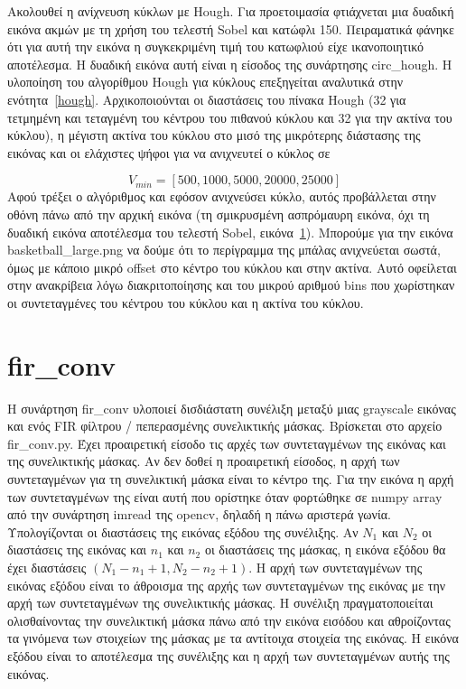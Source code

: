 \documentclass{article}
\begin{document}
Ακολουθεί η ανίχνευση κύκλων με Hough. Για προετοιμασία φτιάχνεται μια δυαδική
εικόνα ακμών με τη χρήση του τελεστή Sobel και κατώφλι 150. Πειραματικά 
φάνηκε ότι για αυτή την εικόνα η συγκεκριμένη τιμή του κατωφλιού είχε ικανοποιητικό
αποτέλεσμα. Η δυαδική εικόνα αυτή είναι η είσοδος της συνάρτησης 
circ\_hough. Η υλοποίηση του αλγορίθμου Hough για κύκλους επεξηγείται αναλυτικά 
στην ενότητα~\ref{hough}. 
Αρχικοποιούνται οι διαστάσεις του πίνακα Hough (32 για τετμημένη και τεταγμένη
του κέντρου του πιθανού κύκλου και 32 για την ακτίνα του κύκλου), η μέγιστη 
ακτίνα του κύκλου στο μισό της μικρότερης διάστασης της εικόνας και οι ελάχιστες
ψήφοι για να ανιχνευτεί ο κύκλος σε 

\[V_{min} = \left[500, 1000, 5000, 20000, 25000\right]\]
Αφού τρέξει ο
αλγόριθμος και εφόσον ανιχνεύσει κύκλο, αυτός προβάλλεται στην οθόνη πάνω 
από την αρχική εικόνα (τη σμικρυσμένη ασπρόμαυρη εικόνα, όχι τη δυαδική εικόνα
αποτέλεσμα του τελεστή Sobel, εικόνα~\ref{}). Μπορούμε για την εικόνα 
basketball\_large.png να δούμε ότι το περίγραμμα της μπάλας ανιχνεύεται σωστά,
όμως με κάποιο μικρό offset στο κέντρο του κύκλου και στην ακτίνα. Αυτό οφείλεται
στην ανακρίβεια λόγω διακριτοποίησης και του μικρού αριθμού bins που χωρίστηκαν 
οι συντεταγμένες του κέντρου του κύκλου και η ακτίνα του κύκλου.

\section{fir\_conv}
Η συνάρτηση fir\_conv υλοποιεί δισδιάστατη συνέλιξη μεταξύ μιας grayscale
εικόνας και ενός FIR φίλτρου / πεπερασμένης συνελικτικής μάσκας. Βρίσκεται στο 
αρχείο fir\_conv.py. Έχει προαιρετική είσοδο τις αρχές των συντεταγμένων 
της εικόνας και της συνελικτικής μάσκας. Αν δεν δοθεί η προαιρετική είσοδος, η αρχή 
των συντεταγμένων για τη συνελικτική μάσκα είναι το κέντρο της. Για την εικόνα
η αρχή των συντεταγμένων της είναι αυτή που ορίστηκε όταν φορτώθηκε σε numpy 
array από την συνάρτηση imread της opencv, δηλαδή η πάνω αριστερά γωνία.
Υπολογίζονται οι διαστάσεις της εικόνας εξόδου της συνέλιξης.
Αν $N_1$ και $N_2$ οι διαστάσεις της εικόνας και $n_1$ και $n_2$ οι διαστάσεις
της μάσκας, η εικόνα εξόδου θα έχει διαστάσεις $(N_1 - n_1 + 1, N_2 - n_2 + 1)$.
Η αρχή των συντεταγμένων της εικόνας εξόδου είναι το άθροισμα της αρχής των συντεταγμένων της 
εικόνας με την αρχή των συντεταγμένων της συνελικτικής μάσκας. Η συνέλιξη 
πραγματοποιείται ολισθαίνοντας την συνελικτική μάσκα πάνω από την εικόνα εισόδου
και αθροίζοντας τα γινόμενα των στοιχείων της μάσκας με τα αντίτοιχα στοιχεία 
της εικόνας. Η εικόνα εξόδου είναι το αποτέλεσμα της συνέλιξης και η αρχή των 
συντεταγμένων αυτής της εικόνας.
\end{document}
